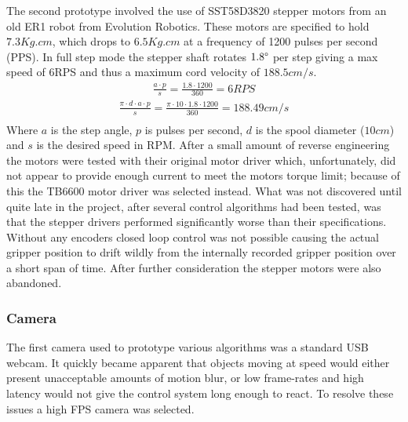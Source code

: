 \documentclass[conference]{IEEEtran}
\begin{document}
The second prototype involved the use of SST58D3820 stepper motors from an old ER1 robot from Evolution Robotics. These motors are specified to hold $7.3Kg.cm$, which drops to $6.5Kg.cm$ at a frequency of 1200 pulses per second (PPS). In full step mode the stepper shaft rotates $1.8\degree$ per step giving a max speed of 6RPS and thus a maximum cord velocity of $188.5cm/s$. \begin{equation}
\begin{aligned}
\frac{a\cdot p}{s} = \frac{1.8\cdot 1200}{360} = 6 RPS
\end{aligned}
\end{equation}
\begin{equation}
\begin{aligned}
\frac{\pi\cdot d\cdot a\cdot p}{s} = \frac{\pi \cdot 10 \cdot 1.8 \cdot 1200}{360} = 188.49 cm/s\\ 
\end{aligned}
\end{equation} Where $a$ is the step angle, $p$ is pulses per second, $d$ is the spool diameter ($10cm$) and $s$ is the desired speed in RPM. After a small amount of reverse engineering the motors were tested with their original motor driver which, unfortunately, did not appear to provide enough current to meet the motors torque limit; because of this the TB6600 motor driver was selected instead. What was not discovered until quite late in the project, after several control algorithms had been tested, was that the stepper drivers performed significantly worse than their specifications. Without any encoders closed loop control was not possible causing the actual gripper position to drift wildly from the internally recorded gripper position over a short span of time. After further consideration the stepper motors were also abandoned.



\subsubsection{Camera}
The first camera used to prototype various algorithms was a standard USB webcam. It quickly became apparent that objects moving at speed would either present unacceptable amounts of motion blur, or low frame-rates and high latency would not give the control system long enough to react. To resolve these issues a high FPS camera was selected. 
\end{document}
